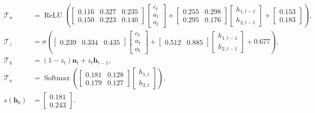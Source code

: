 \documentclass[10pt,a4paper]{article}
\begin{document}
\begin{align*}
\mathcal T_n &= \operatorname{ReLU}\!\left(\begin{bmatrix}0.116 & 0.327 & 0.235 \\ 0.150 & 0.223 & 0.140\end{bmatrix}\begin{bmatrix}c_t \\ a_t \\ o_t\end{bmatrix} + \begin{bmatrix}0.255 & 0.298 \\ 0.295 & 0.176\end{bmatrix}\begin{bmatrix}h_{1,t-1} \\ h_{2,t-1}\end{bmatrix} + \begin{bmatrix}0.153 \\ 0.183\end{bmatrix}\right), \\[1em]
\mathcal T_z &= \sigma\!\left(\begin{bmatrix}0.239 & 0.334 & 0.435\end{bmatrix}\begin{bmatrix}c_t \\ a_t \\ o_t\end{bmatrix} + \begin{bmatrix}0.512 & 0.885\end{bmatrix}\begin{bmatrix}h_{1,t-1} \\ h_{2,t-1}\end{bmatrix} + 0.677\right), \\[1em]
\mathcal T_h &= (1-z_t)\mathbf n_t + z_t\mathbf h_{t-1}, \\[1em]
\mathcal T_a &= \operatorname{Softmax}\!\left(\begin{bmatrix}0.181 & 0.128 \\ 0.179 & 0.127\end{bmatrix}\begin{bmatrix}h_{1,t} \\ h_{2,t}\end{bmatrix}\right), \\[1em]
s(\mathbf h_0) &= \begin{bmatrix}0.181 \\ 0.243\end{bmatrix}.
\end{align*}\endgroup
\end{document}
